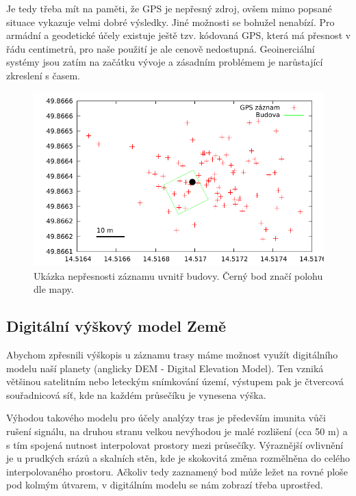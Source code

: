 \documentclass[thesis=B,czech]{FITthesis}[2012/06/26]
\begin{document}
Je tedy třeba mít na paměti, že GPS je nepřesný zdroj, ovšem mimo popsané situace vykazuje velmi dobré výsledky. Jiné možnosti se bohužel nenabízí. Pro armádní a geodetické účely existuje ještě tzv. kódovaná GPS, která má přesnost v řádu centimetrů, pro naše použití je ale cenově nedostupná. Geoinerciální systémy jsou zatím na začátku vývoje a zásadním problémem je narůstající zkreslení s časem.


 \begin{figure}\centering
 	\includegraphics{grafy/gps.pdf}
 	\caption{Ukázka nepřesnosti záznamu uvnitř budovy. Černý bod značí polohu dle mapy.}
	\label{img:gpsSkakani}
 \end{figure}



\subsection{Digitální výškový model Země}
\label{dem}
Abychom zpřesnili výškopis u záznamu trasy máme možnost využít digitálního modelu naší planety  (anglicky DEM - Digital Elevation Model). Ten vzniká většinou satelitním nebo leteckým snímkování území, výstupem pak je čtvercová souřadnicová síť, kde na každém průsečíku je vynesena výška. 

Výhodou takového modelu pro účely analýzy tras je především imunita vůči rušení signálu, na druhou stranu velkou nevýhodou je malé rozlišení (cca 50 m) a s tím spojená nutnost interpolovat prostory mezi průsečíky. Výraznější ovlivnění je u prudkých srázů a skalních stěn, kde je skokovitá změna rozmělněna do celého interpolovaného prostoru. Ačkoliv tedy zaznamený bod může ležet na rovné ploše pod kolmým útvarem, v digitálním modelu se nám zobrazí třeba uprostřed.
\end{document}
